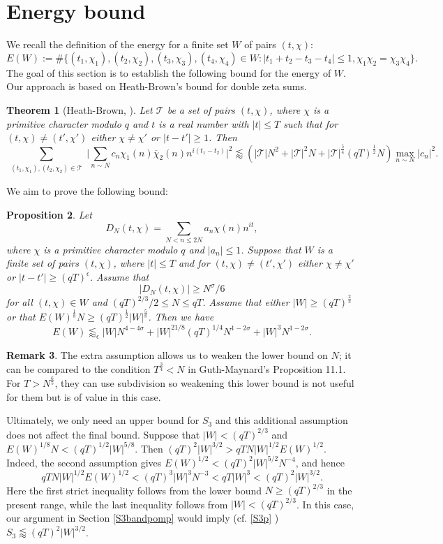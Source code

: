 \documentclass[12pt]{amsart}
\newtheorem{theorem}{Theorem}[section]
\newtheorem{proposition}[theorem]{Proposition}
\theoremstyle{definition}
\newtheorem{remark}[theorem]{Remark}
\theoremstyle{plain}
\theoremstyle{remark}
\numberwithin{equation}{section}
\numberwithin{theorem}{section}
\numberwithin{equation}{section}
\begin{document}
	\section{Energy bound}\label{Engb}
	We recall the definition of the energy for a finite set $W$ of pairs $(t, \chi)$:
	\[E(W):=\# \{ (t_1,\chi_1), (t_2,\chi_2), (t_3,\chi_3) , (t_4,\chi_4) \in W :     |t_{1}+t_{2}-t_{3}-t_{4}| \leq 1,  \chi_{1}\chi_{2}=\chi_{3}\chi_{4}\}.\] 
	The goal of this section is to establish the following bound for the energy of $W$. Our approach is based on Heath-Brown's bound for double zeta sums.
	\begin{theorem}[Heath-Brown, \cite{HBLV}]\label{HBT}
		Let $\mathcal{T}$ be a set of pairs $(t, \chi)$,   where $\chi$ is a primitive character modulo $q$ and $t$ is a real number with $|t|\leq T$ such that for $(t, \chi)\neq (t', \chi')$ either $\chi \neq \chi'$ or $|t-t'|\geq 1$. Then
		\[\sum_{\substack{(t_1,\chi_1),(t_2,\chi_2)\in \mathcal{T}}}\bigg|\sum_{n \sim N} c_{n}\chi_{1}(n)\overline{\chi}_{2}(n)n^{i(t_{1}-t_{2})}\bigg|^{2} \lessapprox(|\mathcal{T}|N^2+|\mathcal{T}|^{2}N+|\mathcal{T}|^{\frac{5}{4}}(qT)^{\frac{1}{2}}N)\max_{n \sim N}|c_{n}|^{2}.\]
	\end{theorem}
	We aim to prove the following bound:
	\begin{proposition}\label{enb}
		Let
		\[
		D_{N}(t, \chi)=\sum_{N < n \leq 2N} a_{n}\chi(n)n^{it},
		\]
		where $\chi$ is a primitive character modulo $q$ and $|a_{n}| \leq1$. Suppose that $W$ is a finite set of pairs $(t, \chi)$,  where $|t| \leq T$ and for $(t, \chi)\neq (t', \chi')$ either $\chi \neq \chi'$ or $|t-t'|\geq (qT)^{\epsilon}$. Assume that
		\[ |D_{N}(t, \chi)| \geq N^{\sigma}/6
		\]
		for all $(t, \chi) \in W$ and $(qT)^{2/3}/2\leq N\leq qT$. Assume that either $|W|\geq (qT)^{\frac{2}{3}}$ or that $E(W)^{\frac{1}{8}}N \geq (qT)^{\frac{1}{2}}|W|^{\frac{5}{8}}$. Then we have
		\[
		E(W)\lessapprox_{\epsilon} |W|N^{4-4\sigma}+|W|^{21/8}(qT)^{1/4}N^{1-2\sigma}+|W|^3N^{1-2\sigma}.
		\]
	\end{proposition}
	\begin{remark}
		The extra assumption allows us to weaken the lower bound on $N$; it can be compared to the condition $T^{\frac{3}{4}} < N$ in Guth-Maynard's Proposition 11.1. For $T>N^{\frac{6}{5}}$, they can use subdivision so weakening this lower bound is not useful for them but is of value in this case.
		
		Ultimately, we only need an upper bound for $S_3$ and this additional
		assumption does not affect the final bound. Suppose that
		$|W|<(qT)^{2/3}$ and
		$E(W)^{1/8}N < (qT)^{1/2}|W|^{5/8}$. Then
		$(qT)^2|W|^{3/2}
		>
		qTN|W|^{1/2}E(W)^{1/2}$.
		Indeed, the second assumption gives
		$E(W)^{1/2}
		<
		(qT)^2|W|^{5/2}N^{-4}$,
		and hence
		\[qTN|W|^{1/2}E(W)^{1/2}
		<
		(qT)^3|W|^3N^{-3}
		<
		qT|W|^3
		<
		(qT)^2|W|^{3/2}.\]
		Here the first strict inequality follows from the lower bound $N \geq (qT)^{2/3}$ in the present range, while the last inequality follows from
		$|W|<(qT)^{2/3}$. In this case, our argument in Section \ref{S3bandpomp} would imply (cf. \eqref{S3p} )
		$S_3 \lessapprox (qT)^2|W|^{3/2}$.
	\end{remark}
	
\end{document}
